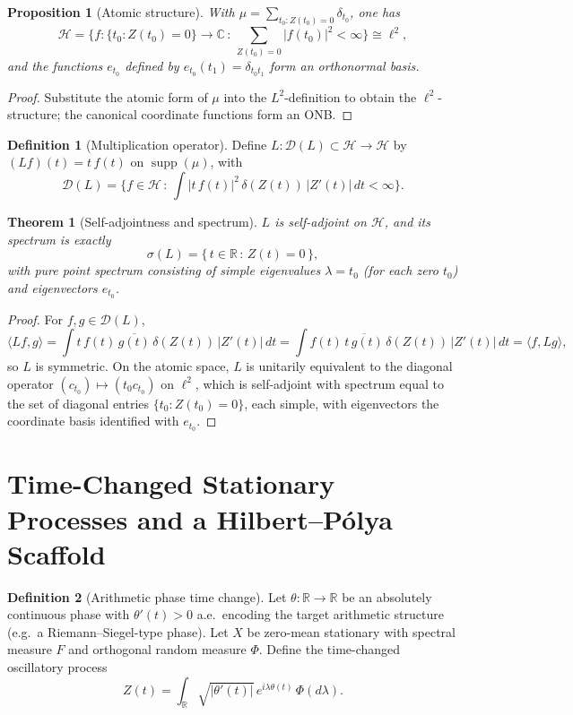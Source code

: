 \documentclass[12pt]{article}
\newtheorem{theorem}{Theorem}
\newtheorem{proposition}{Proposition}
\theoremstyle{definition}
\newtheorem{definition}{Definition}
\theoremstyle{remark}
\DeclareMathOperator{\supp}{supp}
\begin{document}
\begin{proposition}[Atomic structure]
With $\mu=\sum_{t_0: Z(t_0)=0}\delta_{t_0}$, one has
\[
\mathcal{H}=\Big\{ f:\{t_0: Z(t_0)=0\}\to\mathbb{C}\,:\, \sum_{Z(t_0)=0} |f(t_0)|^2<\infty\Big\}\cong \ell^2,
\]
and the functions $e_{t_0}$ defined by $e_{t_0}(t_1)=\delta_{t_0t_1}$ form an orthonormal basis.
\end{proposition}

\begin{proof}
Substitute the atomic form of $\mu$ into the $L^2$-definition to obtain the $\ell^2$-structure; the canonical coordinate functions form an ONB.
\end{proof}

\begin{definition}[Multiplication operator]
Define $L:\mathcal{D}(L)\subset\mathcal{H}\to\mathcal{H}$ by $(Lf)(t)=t\,f(t)$ on $\supp(\mu)$, with
\[
\mathcal{D}(L)=\Big\{ f\in\mathcal{H}\,:\, \int |t\,f(t)|^2\,\delta(Z(t))\,|Z'(t)|\,dt<\infty\Big\}.
\]
\end{definition}

\begin{theorem}[Self-adjointness and spectrum]
$L$ is self-adjoint on $\mathcal{H}$, and its spectrum is exactly
\[
\sigma(L)=\{\, t\in\mathbb{R}\,:\, Z(t)=0 \,\},
\]
with pure point spectrum consisting of simple eigenvalues $\lambda=t_0$ (for each zero $t_0$) and eigenvectors $e_{t_0}$.
\end{theorem}

\begin{proof}
For $f,g\in\mathcal{D}(L)$,
\[
\langle Lf,g\rangle = \int t\,f(t)\,\overline{g(t)}\,\delta(Z(t))\,|Z'(t)|\,dt
= \int f(t)\,\overline{t\,g(t)}\,\delta(Z(t))\,|Z'(t)|\,dt = \langle f,Lg\rangle,
\]
so $L$ is symmetric. On the atomic space, $L$ is unitarily equivalent to the diagonal operator $(c_{t_0})\mapsto (t_0 c_{t_0})$ on $\ell^2$, which is self-adjoint with spectrum equal to the set of diagonal entries $\{t_0: Z(t_0)=0\}$, each simple, with eigenvectors the coordinate basis identified with $e_{t_0}$.
\end{proof}

\section{Time-Changed Stationary Processes and a Hilbert--P\'olya Scaffold}

\begin{definition}[Arithmetic phase time change]
Let $\theta:\mathbb{R}\to\mathbb{R}$ be an absolutely continuous phase with $\theta'(t)>0$ a.e.\ encoding the target arithmetic structure (e.g.\ a Riemann--Siegel-type phase). Let $X$ be zero-mean stationary with spectral measure $F$ and orthogonal random measure $\Phi$. Define the time-changed oscillatory process
\[
Z(t)=\int_{\mathbb{R}} \sqrt{|\theta'(t)|}\,e^{i\lambda \theta(t)}\,\Phi(d\lambda).
\]
\end{definition}
\end{document}
